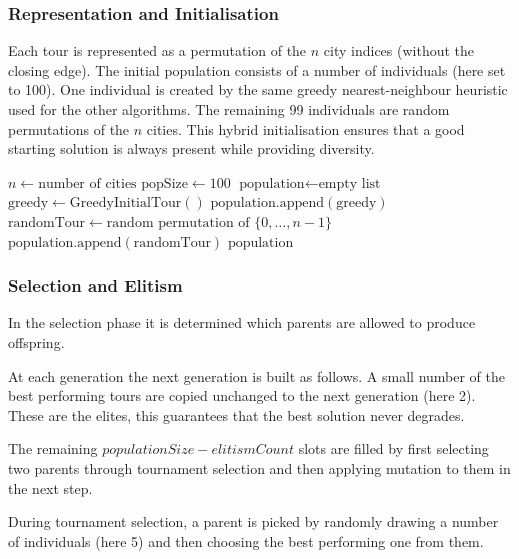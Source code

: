 \subsubsection{Representation and Initialisation}
Each tour is represented as a permutation of the \(n\) city indices (without the closing edge).
The initial population consists of a number of individuals (here set to 100).
One individual is created by the same greedy nearest-neighbour heuristic used for the other algorithms.
The remaining 99 individuals are random permutations of the \( n \) cities.
This hybrid initialisation ensures that a good starting solution is always present while providing diversity.

\begin{algorithm}[H]
	\caption{Genetic: Initialisation of the Population}
	\label{alg:ga-init}
	\begin{algorithmic}[1]
		\STATE $n \gets \text{number of cities}$
		\STATE $\text{popSize} \gets 100$
		\STATE $\text{population} \gets \text{empty list}$
		\STATE $\text{greedy} \gets \text{GreedyInitialTour}()$
		\STATE $\text{population.append}(\text{greedy})$
		\STATE $\text{randomTour} \gets \text{random permutation of } \{0,\dots,n-1\}$
		\STATE $\text{population.append}(\text{randomTour})$
		\ENDWHILE
		\RETURN $\text{population}$
	\end{algorithmic}
\end{algorithm}

\subsubsection{Selection and Elitism}
In the selection phase it is determined which parents are allowed to produce offspring.

At each generation the next generation is built as follows.
A small number of the best performing tours are copied unchanged to the next generation (here 2). These are the elites, this guarantees that the best solution never degrades.

The remaining \( populationSize - elitismCount \) slots are filled by first selecting two parents through tournament selection and then applying mutation to them in the next step.

During tournament selection, a parent is picked by randomly drawing a number of individuals (here 5) and then choosing the best performing one from them.




